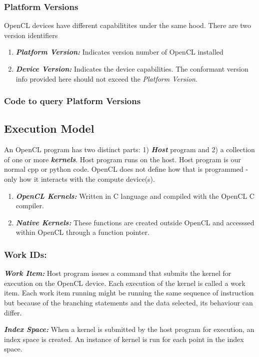 \documentclass[10pt]{article}
\begin{document}
\subsubsection{Platform Versions}
OpenCL devices have different capabilitites under the same hood. There are two version identifiers
\begin{enumerate}
	\item \textit{\textbf{Platform Version:}} Indicates version number of OpenCL installed
	\item \textit{\textbf{Device Version:}} Indicates the device capabilities. The conformant version info provided here should not exceed the \textit{Platform Version}.
\end{enumerate}

\subsubsection{Code to query Platform Versions}

\subsection{Execution Model}
An OpenCL program has two distinct parts: 1) \textbf{\textit{Host}} program and 2) a collection of one or more \textbf{\textit{kernels}}. Host program runs on the host. Host program is our normal cpp or python code. OpenCL does not define how that is programmed - only how it interacts with the compute device(s).
\begin{enumerate}
	\item \textbf{\textit{OpenCL Kernels:}} Written in C language and compiled with the OpenCL C compiler.
	\item \textbf{\textit{Native Kernels:}} These functions are created outside OpenCL and accesssed within OpenCL through a function pointer.
\end{enumerate}

\subsubsection{Work IDs:}
\textit{\textbf{Work Item:}} Host program issues a command that submits the kernel for execution on the OpenCL device. Each execution of the kernel is called a work item. Each work item running might be running the same sequence of instruction but because of the branching statements and the data selected, its behaviour can differ. 

\textit{\textbf{Index Space:}} When a kernel is submitted by the host program for execution, an index space is created. An instance of kernel is run for each point in the index space.
\end{document}
